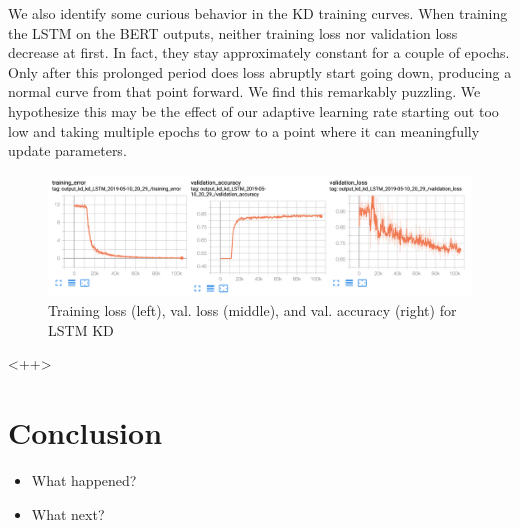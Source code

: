 \documentclass[10pt]{article}
\begin{document}
We also identify some curious behavior in the KD training curves. When training
the LSTM on the BERT outputs, neither training loss nor validation loss decrease
at first. In fact, they stay approximately constant for a couple of epochs. Only
after this prolonged period does loss abruptly start going down, producing a
normal curve from that point forward. We find this remarkably puzzling. We
hypothesize this may be the effect of our adaptive learning rate starting out
too low and taking multiple epochs to grow to a point where it can meaningfully
update parameters. 

\begin{figure}[tb]
\centering
\includegraphics{../figs/kd_lstm_training.png}
\caption{Training loss (left), val. loss (middle), and val. accuracy
(right) for LSTM KD}
\label{fig:<+label+>}
\end{figure}<++>

% 




\section{Conclusion}

\begin{itemize}
\item What happened?
\item What next?
\end{itemize}
\end{document}
